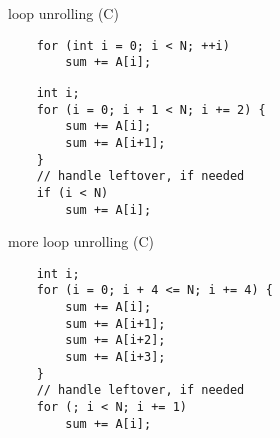 \begin{frame}[fragile,label=loopUnrollC]{loop unrolling (C)}
\begin{lstlisting}
    for (int i = 0; i < N; ++i)
        sum += A[i];
\end{lstlisting}
\hrulefill
\begin{lstlisting}
    int i;
    for (i = 0; i + 1 < N; i += 2) {
        sum += A[i];
        sum += A[i+1];
    }
    // handle leftover, if needed
    if (i < N)
        sum += A[i];
\end{lstlisting}
\end{frame}

\begin{frame}[fragile,label=loopUnrollC2]{more loop unrolling (C)}
\begin{lstlisting}
    int i;
    for (i = 0; i + 4 <= N; i += 4) {
        sum += A[i];
        sum += A[i+1];
        sum += A[i+2];
        sum += A[i+3];
    }
    // handle leftover, if needed
    for (; i < N; i += 1)
        sum += A[i];
\end{lstlisting}
\end{frame}
